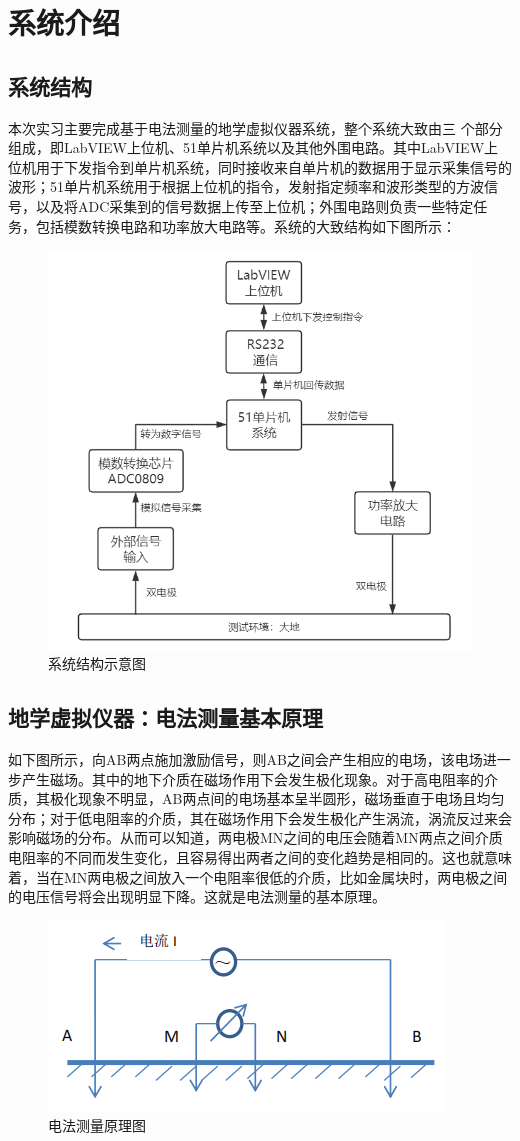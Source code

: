 \documentclass[UTF8]{article}
\begin{document}
%
\section{系统介绍}
\subsection{系统结构}
本次实习主要完成基于电法测量的地学虚拟仪器系统，整个系统大致由三
个部分组成，即LabVIEW上位机、51单片机系统以及其他外围电路。其中LabVIEW上位机用于下发指令到单片机系统，同时接收来自单片机的数据用于显示采集信号的波形；51单片机系统用于根据上位机的指令，发射指定频率和波形类型的方波信号，以及将ADC采集到的信号数据上传至上位机；外围电路则负责一些特定任务，包括模数转换电路和功率放大电路等。系统的大致结构如下图所示：
\begin{figure}[H]
    \centering %
    \includegraphics[width=.6\textwidth]{figure/系统结构.png} 
    \caption{系统结构示意图} %
\end{figure}

\subsection{地学虚拟仪器：电法测量基本原理}
如下图所示，向AB两点施加激励信号，则AB之间会产生相应的电场，该电场进一步产生磁场。其中的地下介质在磁场作用下会发生极化现象。对于高电阻率的介质，其极化现象不明显，AB两点间的电场基本呈半圆形，磁场垂直于电场且均匀分布；对于低电阻率的介质，其在磁场作用下会发生极化产生涡流，涡流反过来会影响磁场的分布。从而可以知道，两电极MN之间的电压会随着MN两点之间介质电阻率的不同而发生变化，且容易得出两者之间的变化趋势是相同的。这也就意味着，当在MN两电极之间放入一个电阻率很低的介质，比如金属块时，两电极之间的电压信号将会出现明显下降。这就是电法测量的基本原理。
\begin{figure}[H]
    \centering %
    \includegraphics[width=.5\textwidth]{figure/电法测量原理图.png} 
    \caption{电法测量原理图} %
\end{figure}
\end{document}
